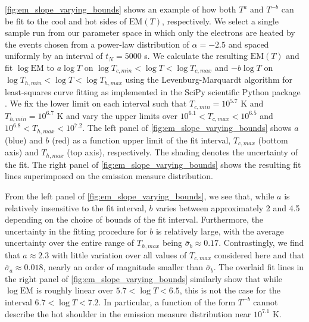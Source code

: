 \documentclass[apj]{emulateapj}
\begin{document}
	\par\autoref{fig:em_slope_varying_bounds} shows an example of how both $T^a$ and $T^{-b}$ can be fit to the cool and hot sides of $\mathrm{EM}(T)$, respectively. We select a single sample run from our parameter space in which only the electrons are heated by the events chosen from a power-law distribution of $\alpha=-2.5$ and spaced uniformly by an interval of $t_N=5000$ s. We calculate the resulting $\mathrm{EM}(T)$ and fit $\log{\mathrm{EM}}$ to $a\log{T}$ on $\log{T_{c,min}}<\log{T}<\log{T_{c,max}}$ and $-b\log{T}$ on $\log{T_{h,min}}<\log{T}<\log{T_{h,max}}$ using the Levenburg-Marquardt algorithm for least-squares curve fitting as implemented in the SciPy scientific Python package \citep{van_der_walt_numpy_2011}. We fix the lower limit on each interval such that $T_{c,min}=10^{5.7}$ K and $T_{h,min} = 10^{6.7}$  K and vary the upper limits over $10^{6.1}<T_{c,max}<10^{6.5}$ and $10^{6.8}<T_{h,max}<10^{7.2}$. The left panel of \autoref{fig:em_slope_varying_bounds} shows $a$ (blue) and $b$ (red) as a function upper limit of the fit interval, $T_{c,max}$ (bottom axis) and $T_{h,max}$ (top axis), respectively. The shading denotes the uncertainty of the fit. The right panel of \autoref{fig:em_slope_varying_bounds} shows the resulting fit lines superimposed on the emission measure distribution.
	\par From the left panel of \autoref{fig:em_slope_varying_bounds}, we see that, while $a$ is relatively insensitive to the fit interval, $b$ varies between approximately 2 and 4.5 depending on the choice of bounds of the fit interval. Furthermore, the uncertainty in the fitting procedure for $b$ is relatively large, with the average uncertainty over the entire range of $T_{h,max}$ being $\bar{\sigma}_b\approx0.17$.  Contrastingly, we find that $a\approx2.3$ with little variation over all values of $T_{c,max}$ considered here and that $\bar{\sigma}_a\approx0.018$, nearly an order of magnitude smaller than $\bar{\sigma}_b$. The overlaid fit lines in the right panel of \autoref{fig:em_slope_varying_bounds} similarly show that while $\log{\mathrm{EM}}$ is roughly linear over $5.7<\log{T}<6.5$, this is not the case for the interval $6.7<\log{T}<7.2$. In particular, a function of the form $T^{-b}$ cannot describe the hot shoulder in the emission measure distribution near $10^{7.1}$ K.
\end{document}
